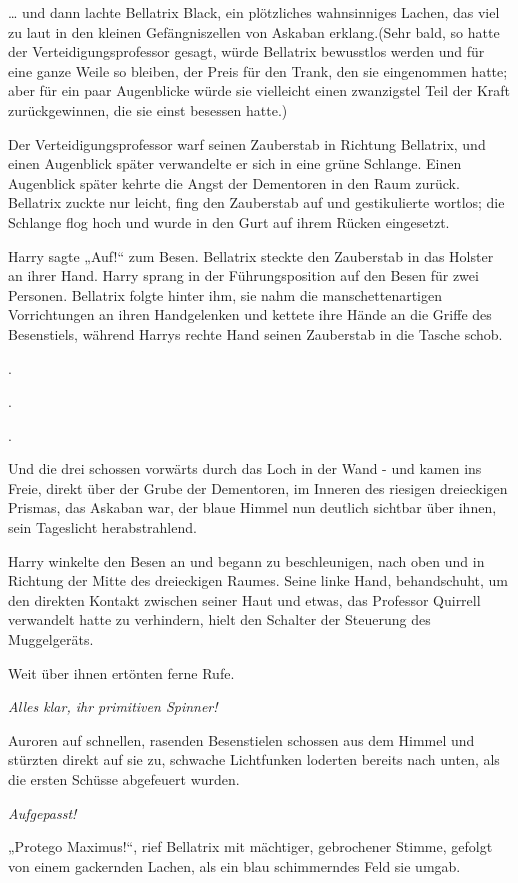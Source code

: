{… und dann lachte Bellatrix Black, ein plötzliches wahnsinniges Lachen, das viel zu laut in den kleinen Gefängniszellen von Askaban erklang.(Sehr bald, so hatte der Verteidigungsprofessor gesagt, würde Bellatrix bewusstlos werden und für eine ganze Weile so bleiben, der Preis für den Trank, den sie eingenommen hatte; aber für ein paar Augenblicke würde sie vielleicht einen zwanzigstel Teil der Kraft zurückgewinnen, die sie einst besessen hatte.)

Der Verteidigungsprofessor warf seinen Zauberstab in Richtung Bellatrix, und einen Augenblick später verwandelte er sich in eine grüne Schlange. Einen Augenblick später kehrte die Angst der Dementoren in den Raum zurück. Bellatrix zuckte nur leicht, fing den Zauberstab auf und gestikulierte wortlos; die Schlange flog hoch und wurde in den Gurt auf ihrem Rücken eingesetzt.

Harry sagte „Auf!“ zum Besen. Bellatrix steckte den Zauberstab in das Holster an ihrer Hand. Harry sprang in der Führungsposition auf den Besen für zwei Personen. Bellatrix folgte hinter ihm, sie nahm die manschettenartigen Vorrichtungen an ihren Handgelenken und kettete ihre Hände an die Griffe des Besenstiels, während Harrys rechte Hand seinen Zauberstab in die Tasche schob.

.

.

.

Und die drei schossen vorwärts durch das Loch in der Wand - und kamen ins Freie, direkt über der Grube der Dementoren, im Inneren des riesigen dreieckigen Prismas, das Askaban war, der blaue Himmel nun deutlich sichtbar über ihnen, sein Tageslicht herabstrahlend.

Harry winkelte den Besen an und begann zu beschleunigen, nach oben und in Richtung der Mitte des dreieckigen Raumes. Seine linke Hand, behandschuht, um den direkten Kontakt zwischen seiner Haut und etwas, das Professor Quirrell verwandelt hatte zu verhindern, hielt den Schalter der Steuerung des Muggelgeräts.

Weit über ihnen ertönten ferne Rufe.

\emph{Alles klar, ihr primitiven Spinner!}

Auroren auf schnellen, rasenden Besenstielen schossen aus dem Himmel und stürzten direkt auf sie zu, schwache Lichtfunken loderten bereits nach unten, als die ersten Schüsse abgefeuert wurden.

\emph{Aufgepasst!}

„Protego Maximus!“, rief Bellatrix mit mächtiger, gebrochener Stimme, gefolgt von einem gackernden Lachen, als ein blau schimmerndes Feld sie umgab.

}
